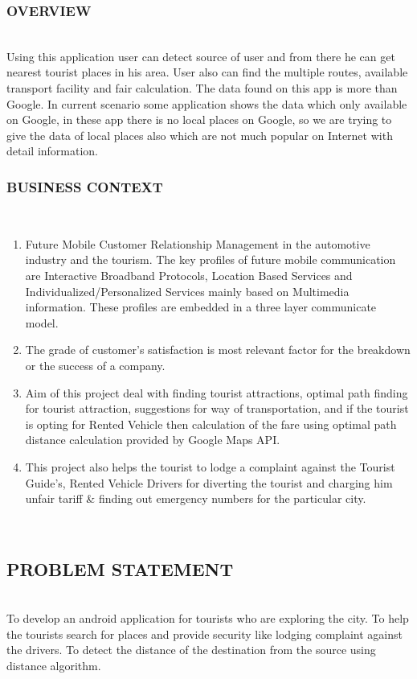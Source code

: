 \documentclass[12pt,a4paper]{article}
\begin{document}
\subsubsection{OVERVIEW}
\\
Using this application user can detect source of user and from there he can get nearest tourist places in his area. User also can find the multiple routes, available transport facility and fair calculation. The data found on this app is more than Google. In current scenario some application shows the data which only available  on Google, in these app there is no local places on Google, so we are trying to give the data of local places also which are not much popular on Internet with detail information.  
\\
\subsubsection{BUSINESS CONTEXT}
\\
\begin{enumerate}
\item Future Mobile Customer Relationship Management in the automotive industry and the tourism. The key profiles of future mobile communication are Interactive Broadband Protocols, Location Based Services and Individualized/Personalized Services mainly based on Multimedia information. These profiles are embedded in a three layer communicate model.
\\
\item The grade of customer’s satisfaction is most relevant factor for the breakdown or the success of a company. 
\\
\item Aim of this project deal with finding tourist attractions, optimal path finding for tourist attraction, suggestions for way of transportation, and if the tourist is opting for Rented Vehicle then calculation of the fare using optimal path distance calculation provided by Google Maps API.
\\
\item This project also helps the tourist to lodge a complaint against the Tourist Guide’s, Rented Vehicle Drivers for diverting the tourist and charging him unfair tariff & finding out emergency numbers for the particular city.
\end{enumerate}
\\
\subsection{PROBLEM STATEMENT}
\\
\hspace{0.7 cm}To develop an android application for tourists who are exploring the city. To help the tourists search for places and provide security like lodging complaint against the drivers. To detect the distance of the destination from the source using distance algorithm.
\\
\end{document}
